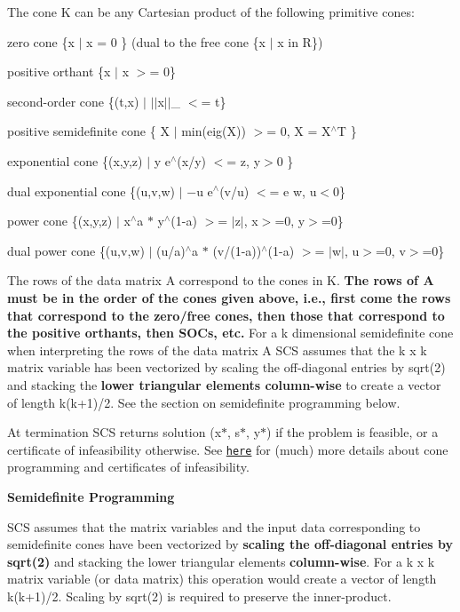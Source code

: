 The cone {\ttfamily K} can be any Cartesian product of the following primitive cones\-:
\begin{DoxyItemize}
\item zero cone {\ttfamily \{x $\vert$ x = 0 \}} (dual to the free cone {\ttfamily \{x $\vert$ x in R\}})
\item positive orthant {\ttfamily \{x $\vert$ x $>$= 0\}}
\item second-\/order cone {\ttfamily \{(t,x) $\vert$ $\vert$$\vert$x$\vert$$\vert$\-\_ $<$= t\}}
\item positive semidefinite cone {\ttfamily \{ X $\vert$ min(eig(\-X)) $>$= 0, X = X$^\wedge$\-T \}}
\item exponential cone {\ttfamily \{(x,y,z) $\vert$ y e$^\wedge$(x/y) $<$= z, y$>$0 \}}
\item dual exponential cone {\ttfamily \{(u,v,w) $\vert$ −u e$^\wedge$(v/u) $<$= e w, u$<$0\}}
\item power cone {\ttfamily \{(x,y,z) $\vert$ x$^\wedge$a $\ast$ y$^\wedge$(1-\/a) $>$= $\vert$z$\vert$, x$>$=0, y$>$=0\}}
\item dual power cone {\ttfamily \{(u,v,w) $\vert$ (u/a)$^\wedge$a $\ast$ (v/(1-\/a))$^\wedge$(1-\/a) $>$= $\vert$w$\vert$, u$>$=0, v$>$=0\}}
\end{DoxyItemize}

The rows of the data matrix {\ttfamily A} correspond to the cones in {\ttfamily K}. {\bfseries The rows of {\ttfamily A} must be in the order of the cones given above, i.\-e., first come the rows that correspond to the zero/free cones, then those that correspond to the positive orthants, then S\-O\-Cs, etc.} For a {\ttfamily k} dimensional semidefinite cone when interpreting the rows of the data matrix {\ttfamily A} S\-C\-S assumes that the {\ttfamily k x k} matrix variable has been vectorized by scaling the off-\/diagonal entries by {\ttfamily sqrt(2)} and stacking the {\bfseries lower triangular elements column-\/wise} to create a vector of length {\ttfamily k(k+1)/2}. See the section on semidefinite programming below.

At termination S\-C\-S returns solution {\ttfamily (x$\ast$, s$\ast$, y$\ast$)} if the problem is feasible, or a certificate of infeasibility otherwise. See \href{http://web.stanford.edu/~boyd/cvxbook/}{\tt here} for (much) more details about cone programming and certificates of infeasibility.

{\bfseries Semidefinite Programming}

S\-C\-S assumes that the matrix variables and the input data corresponding to semidefinite cones have been vectorized by {\bfseries scaling the off-\/diagonal entries by {\ttfamily sqrt(2)}} and stacking the lower triangular elements {\bfseries column-\/wise}. For a {\ttfamily k x k} matrix variable (or data matrix) this operation would create a vector of length {\ttfamily k(k+1)/2}. Scaling by {\ttfamily sqrt(2)} is required to preserve the inner-\/product.

